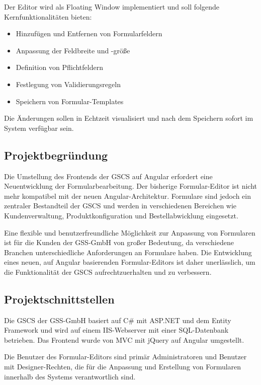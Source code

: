 \documentclass[a4paper,11pt]{article}
\begin{document}
Der Editor wird als Floating Window implementiert und soll folgende Kernfunktionalitäten bieten:

\begin{itemize}
\item Hinzufügen und Entfernen von Formularfeldern
\item Anpassung der Feldbreite und -größe
\item Definition von Pflichtfeldern
\item Festlegung von Validierungsregeln
\item Speichern von Formular-Templates
\end{itemize}

Die Änderungen sollen in Echtzeit visualisiert und nach dem Speichern sofort im System verfügbar sein.

\subsection{Projektbegründung}

Die Umstellung des Frontends der GSCS auf Angular erfordert eine Neuentwicklung der Formularbearbeitung. Der bisherige Formular-Editor ist nicht mehr kompatibel mit der neuen Angular-Architektur. Formulare sind jedoch ein zentraler Bestandteil der GSCS und werden in verschiedenen Bereichen wie Kundenverwaltung, Produktkonfiguration und Bestellabwicklung eingesetzt.

Eine flexible und benutzerfreundliche Möglichkeit zur Anpassung von Formularen ist für die Kunden der GSS-GmbH von großer Bedeutung, da verschiedene Branchen unterschiedliche Anforderungen an Formulare haben. Die Entwicklung eines neuen, auf Angular basierenden Formular-Editors ist daher unerlässlich, um die Funktionalität der GSCS aufrechtzuerhalten und zu verbessern.

\subsection{Projektschnittstellen}

Die GSCS der GSS-GmbH basiert auf C\# mit ASP.NET und dem Entity Framework und wird auf einem IIS-Webserver mit einer SQL-Datenbank betrieben. Das Frontend wurde von MVC mit jQuery auf Angular umgestellt.

Die Benutzer des Formular-Editors sind primär Administratoren und Benutzer mit Designer-Rechten, die für die Anpassung und Erstellung von Formularen innerhalb des Systems verantwortlich sind.
\end{document}
